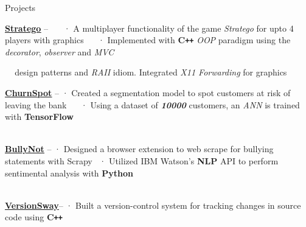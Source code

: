 \documentclass{resume} %
\begin{document}
\begin{rSection}{Projects}
  \begin{rProjectSection}
    \item {\href{mailto:n5hossai@edu.uwaterloo.ca}{\underline{\textbf {Stratego}}}} --  \,\,\,\,\,\,\,\,\,· A multiplayer functionality of the game \textit{Stratego} for upto 4 players with graphics
    \vspace{-0.2em}
    \hspace{21.4mm}  \,\,\,\,\,\,\,\,· Implemented with \textbf{C\texttt{++}} \textit{OOP} paradigm  using the  \textit{decorator}, \textit{observer} and \textit{MVC}\\
\vspace{-1.5em}

    \hspace{24mm}   \,\,\,\,\,\,\,design patterns and \textit{RAII} idiom. Integrated \textit{X11 Forwarding} for graphics
    
    
    \vspace{0.5em}
    \item {\href{https://github.com/n5hossai/ChurnSpot}{\underline{\textbf {ChurnSpot}}}} --  · Created a segmentation model to spot customers at risk of leaving the bank
    \vspace{-0.2em}
    \hspace{21.4mm}  \,\,\,\,\,\,\,\,· Using a dataset of \textbf{\textit{10000}}  customers, an \textit{ANN} is trained with \textbf{TensorFlow}\\
\vspace{-1.5em}\\
    \item {\href{https://github.com/n5hossai/BullyNot}{\underline{\textbf {BullyNot}}}} -- \hspace{4mm} ·  Designed a browser extension to web scrape for bullying statements with Scrapy 
    \vspace{-0.2em}
    \hspace{21.4mm}  \hspace{4mm}\,\,\,·  Utilized IBM Watson’s \textbf{NLP} API to perform sentimental analysis with \textbf{Python}\\ \\
\vspace{-1.5em}

    \item {\href{https://github.com/n5hossai/VersionSway}{\underline{\textbf {VersionSway}}}}--\hspace{0mm}\,\,·  Built a version-control system for tracking changes in source code using \textbf{C\texttt{++}}


\end{rProjectSection}
\end{rSection}
\end{document}
